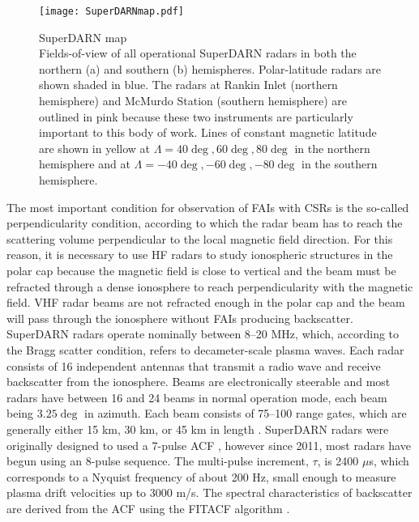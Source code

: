 \begin{figure}
	\centering
	\texttt{[image: SuperDARNmap.pdf]}
	\caption[SuperDARN map]{{\:}SuperDARN map\\ Fields-of-view of all operational SuperDARN radars in both the northern (a) and southern (b) hemispheres.  Polar-latitude radars are shown shaded in blue.  The radars at Rankin Inlet (northern hemisphere) and McMurdo Station (southern hemisphere) are outlined in pink because these two instruments are particularly important to this body of work.  Lines of constant magnetic latitude are shown in yellow at \(\Lambda = 40\deg, 60\deg, 80\deg\) in the northern hemisphere and at \(\Lambda = -40\deg,-60\deg,-80\deg\) in the southern hemisphere.}
	\label{fig:superdarnmap}
\end{figure}

The most important condition for observation of FAIs with CSRs is the so-called perpendicularity condition, according to which the radar beam has to reach the scattering volume perpendicular to the local magnetic field direction.  For this reason, it is necessary to use HF radars to study ionospheric structures in the polar cap because the magnetic field is close to vertical and the beam must be refracted through a dense ionosphere to reach perpendicularity with the magnetic field.  VHF radar beams are not refracted enough in the polar cap and the beam will pass through the ionosphere without FAIs producing backscatter.  SuperDARN radars operate nominally between 8--20 MHz, which, according to the Bragg scatter condition, refers to decameter-scale plasma waves.  Each radar consists of 16 independent antennas that transmit a radio wave and receive backscatter from the ionosphere.  Beams are electronically steerable and most radars have between 16 and 24 beams in normal operation mode, each beam being \(3.25\deg\) in azimuth.  Each beam consists of 75--100 range gates, which are generally either 15 km, 30 km, or 45 km in length \citep{Chisham2007}.  SuperDARN radars were originally designed to used a 7-pulse ACF \citep{Farley1972,Greenwald1983,Greenwald1985}, however since 2011, most radars have begun using an 8-pulse sequence.   The multi-pulse increment, \(\tau\), is 2400 \(\mu\)s, which corresponds to a Nyquist frequency of about 200 Hz, small enough to measure plasma drift velocities up to 3000 m/s.  The spectral characteristics of backscatter are derived from the ACF using the FITACF algorithm \citep{Ponomarenko2006}.

